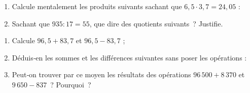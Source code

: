 \begin{exercice}
\begin{enumerate}
 \item Calcule mentalement les produits suivants sachant que $6,5 \cdot 3,7 = 24,05$ :
  
 \item Sachant que $935 : 17 = 55$, que dire des quotients suivants ? Justifie.   
 \end{enumerate}
\end{exercice}


\begin{exercice}
\begin{enumerate}
 \item Calcule $96,5 + 83,7$ et $96,5 - 83,7$ ;
 \item Déduis‑en les sommes et les différences suivantes sans poser les opérations :
 \item Peut‑on trouver par ce moyen les résultats des opérations $96\,500 + 8\,370$ et $9\,650 - 837$ ? Pourquoi ?
 \end{enumerate}
\end{exercice}


